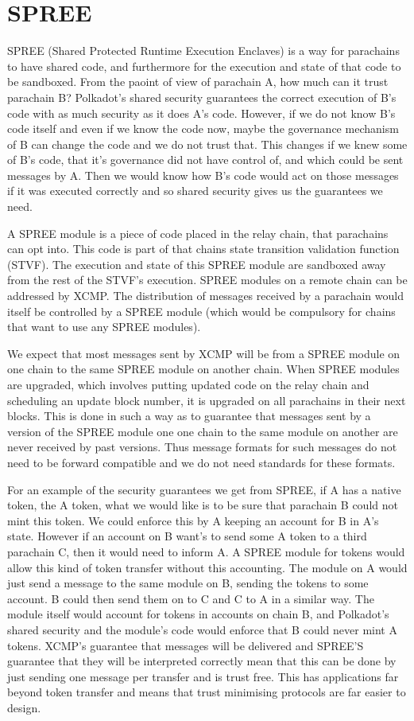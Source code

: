 
\section{SPREE} \label{sec:SPREE}

SPREE (Shared Protected Runtime Execution Enclaves) is a way for parachains to have shared code, and furthermore for the execution and state of that code to be sandboxed. From the paoint of view of parachain A, how much can it trust parachain B? Polkadot's shared security guarantees the correct execution of B's code with as much security as it does A's code. However, if we do not know B's code itself and even if we know the code now, maybe the governance mechanism of B can change the code and we do not trust that. This changes if we knew some of B's code, that it's governance did not have control of, and which could be sent messages by A. Then we would know how B's code would act on those messages if it was executed correctly and so shared security gives us the guarantees we need.

A SPREE module is a piece of code placed in the relay chain, that parachains can opt into. This code is part of that chains state transition validation function (STVF). The execution and state of this SPREE module are sandboxed away from the rest of the STVF's execution. SPREE modules on a remote chain can be addressed by XCMP. The distribution of messages received by a parachain would itself be controlled by a SPREE module (which would be compulsory for chains that want to use any SPREE modules). 

We expect that most messages sent by XCMP will be from a SPREE module on one chain to the same SPREE module on another chain. When SPREE modules are upgraded, which involves putting updated code on the relay chain and scheduling an update block number, it is upgraded on all parachains in their next blocks. This is done in such a way as to guarantee that messages sent by a version of the SPREE module one one chain to the same module on another are never received by past versions. Thus message formats for such messages do not need to be forward compatible and we do not need standards for these formats.

For an example of the security guarantees we get from SPREE, if A has a native token, the A token, what we would like is to be sure that parachain B could not mint this token. We could enforce this by A keeping an account for B in A's state. However if an account on B want's to send some A token to a third parachain C, then it would need to inform A. A SPREE module for tokens would allow this kind of token transfer without this accounting. The module on A would just send a message to the same module on B, sending the tokens to some account. B could then send them on to C and C to A in a similar way. The module itself would account for tokens in accounts on chain B, and Polkadot's shared security and the module's code would enforce that B could never mint A tokens. XCMP's guarantee that messages will be delivered and SPREE'S guarantee that they will be interpreted correctly mean that this can be done by just sending one message per transfer and is trust free. This has applications far beyond token transfer and means that trust minimising protocols are far easier to design.

